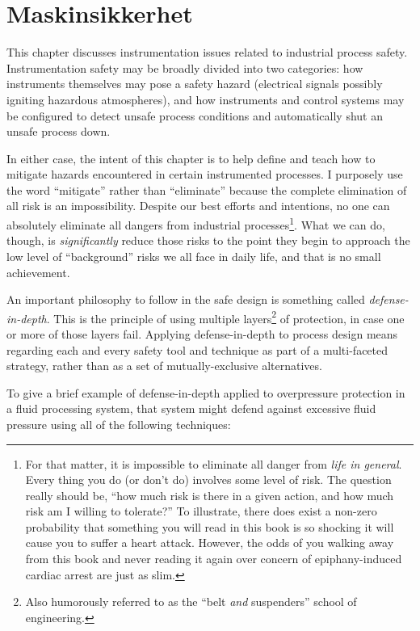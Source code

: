 
\chapter{Maskinsikkerhet}

This chapter discusses instrumentation issues related to industrial process safety.  Instrumentation safety may be broadly divided into two categories: how instruments themselves may pose a safety hazard (electrical signals possibly igniting hazardous atmospheres), and how instruments and control systems may be configured to detect unsafe process conditions and automatically shut an unsafe process down.

In either case, the intent of this chapter is to help define and teach how to mitigate hazards encountered in certain instrumented processes.  I purposely use the word ``mitigate'' rather than ``eliminate'' because the complete elimination of all risk is an impossibility.  Despite our best efforts and intentions, no one can absolutely eliminate all dangers from industrial processes\footnote{For that matter, it is impossible to eliminate all danger from \textit{life in general}.  Every thing you do (or don't do) involves some level of risk.  The question really should be, ``how much risk is there in a given action, and how much risk am I willing to tolerate?''  To illustrate, there does exist a non-zero probability that something you will read in this book is so shocking it will cause you to suffer a heart attack.  However, the odds of you walking away from this book and never reading it again over concern of epiphany-induced cardiac arrest are just as slim.}.  What we can do, though, is \textit{significantly} reduce those risks to the point they begin to approach the low level of ``background'' risks we all face in daily life, and that is no small achievement.

\vskip 10pt

An important philosophy to follow in the safe design is something called \textit{defense-in-depth}.  This is the principle of using multiple layers\footnote{Also humorously referred to as the ``belt \textit{and} suspenders'' school of engineering.} of protection, in case one or more of those layers fail.  Applying defense-in-depth to process design means regarding each and every safety tool and technique as part of a multi-faceted strategy, rather than as a set of mutually-exclusive alternatives.  

To give a brief example of defense-in-depth applied to overpressure protection in a fluid processing system, that system might defend against excessive fluid pressure using all of the following techniques:

